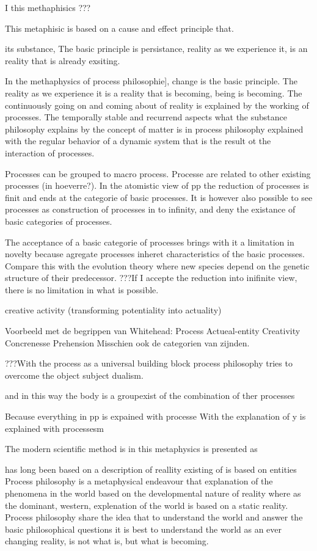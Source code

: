 I this methaphisics ???


This metaphisic is based on a cause and effect principle that.

its substance, The basic principle is persistance, reality as we experience it, is an reality that is already exsiting.

In the methaphysics of process philosophie], change is the basic principle. The reality as we experience it is a reality that is becoming, being is becoming.
The continuously going on and coming about of reality is explained by the working of processes. The temporally stable and recurrend aspects what the substance philosophy explains by the concept of matter is in process philosophy explained with the regular behavior of a dynamic system that is the result ot the interaction of processes.

Processes can be grouped to macro process. Processe are related to other existing processes (in hoeverre?).
In the atomistic view of pp the reduction of processes is finit and ends at the categorie of basic processes. It is however also possible to see processes as construction of processes in to infinity, and deny the existance of basic categories of processes.

The acceptance of a basic categorie of processes brings with it a limitation in novelty because agregate processes inheret characteristics of the basic processes. Compare this with the evolution theory where new species depend on the genetic structure of their predecessor.
???If I accepte the reduction into inifinite view, there is no limitation in what is possible.

creative activity (transforming potentiality into actuality)

Voorbeeld met de begrippen van Whitehead:
Process
Actueal-entity
Creativity
Concrenesse
Prehension
Misschien ook de categorien van zijnden.


???With the process as a universal building block process philosophy tries to overcome the object subject dualism.

and in this way the body is a groupexist of the combination of ther processes

Because everything in pp is expained with processe
With the explanation of y is explained with processesm




The modern scientific method is 
in this metaphysics is presented as 


has long been based on a description of reallity existing of 
is based on entities
Process philosophy is a metaphysical endeavour that  explanation of the phenomena in the world based on the developmental nature of reality where as the dominant, western, explenation of the world is based on a static reality. 
Process philosophy share the idea that to understand the world and answer the basic philosophical questions it is best to understand the world as an ever changing reality, is not what is, but what is becoming.

